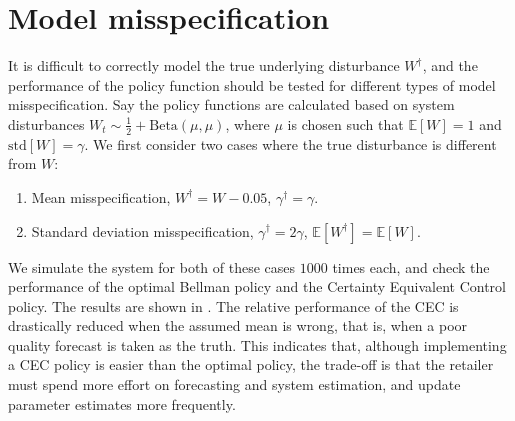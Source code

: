 \documentclass[main.tex]{subfiles}
\begin{document}



\listoftodos

\section{Model
  misspecification}\label{sec:markdown_miss_specification}
It is difficult to correctly model the true underlying disturbance
$W^\dagger$, and the performance of the policy function should be
tested for different types of model misspecification.
Say the policy functions are calculated based on
system disturbances $W_t\sim \frac{1}{2}+\mathrm{Beta}(\mu,\mu)$, where
$\mu$ is chosen such that $\mathbb E[W]=1$ and $\mbox{std}[W]=\gamma$.
We first consider two cases where the true disturbance is
different from $W$:
\begin{enumerate}
\item Mean misspecification, $W^\dagger = W-0.05$, $\gamma^\dagger=\gamma$.
\item Standard deviation misspecification, $\gamma^\dagger = 2\gamma$,
  $\mathbb E[W^\dagger] = \mathbb E[W]$.
\end{enumerate}
We simulate the system for both of these cases $1000$ times each,
and check the performance of the optimal Bellman policy and the
Certainty Equivalent Control policy. The results are shown in
.
The relative performance of the CEC is drastically reduced when the
assumed mean is wrong, that is, when a poor quality forecast is taken as
the truth. This indicates that, although implementing a CEC policy is
easier than the optimal policy, the trade-off is that the retailer
must spend more effort on forecasting and system estimation, and
update parameter estimates more frequently.
\end{document}
